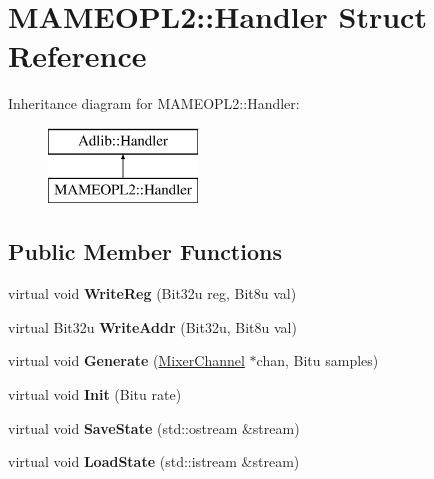 \hypertarget{structMAMEOPL2_1_1Handler}{\section{M\-A\-M\-E\-O\-P\-L2\-:\-:Handler Struct Reference}
\label{structMAMEOPL2_1_1Handler}
}
Inheritance diagram for M\-A\-M\-E\-O\-P\-L2\-:\-:Handler\-:\begin{figure}[H]
\begin{center}
\leavevmode
\includegraphics[height=2.000000cm]{structMAMEOPL2_1_1Handler}
\end{center}
\end{figure}
\subsection*{Public Member Functions}
\begin{DoxyCompactItemize}
\item 
\hypertarget{structMAMEOPL2_1_1Handler_a9432a798ae5818d012a865b4ec05efbb}{virtual void {\bfseries Write\-Reg} (Bit32u reg, Bit8u val)}\label{structMAMEOPL2_1_1Handler_a9432a798ae5818d012a865b4ec05efbb}

\item 
\hypertarget{structMAMEOPL2_1_1Handler_a697cf8d3aaa763a99ca01c51b193a152}{virtual Bit32u {\bfseries Write\-Addr} (Bit32u, Bit8u val)}\label{structMAMEOPL2_1_1Handler_a697cf8d3aaa763a99ca01c51b193a152}

\item 
\hypertarget{structMAMEOPL2_1_1Handler_a825d60c8d94af76fb466f980725ebe79}{virtual void {\bfseries Generate} (\hyperlink{classMixerChannel}{Mixer\-Channel} $\ast$chan, Bitu samples)}\label{structMAMEOPL2_1_1Handler_a825d60c8d94af76fb466f980725ebe79}

\item 
\hypertarget{structMAMEOPL2_1_1Handler_ae1ae4dd98b7022333e50505a8b36d78f}{virtual void {\bfseries Init} (Bitu rate)}\label{structMAMEOPL2_1_1Handler_ae1ae4dd98b7022333e50505a8b36d78f}

\item 
\hypertarget{structMAMEOPL2_1_1Handler_a4324807b758bae86fac4aaa0001a031f}{virtual void {\bfseries Save\-State} (std\-::ostream \&stream)}\label{structMAMEOPL2_1_1Handler_a4324807b758bae86fac4aaa0001a031f}

\item 
\hypertarget{structMAMEOPL2_1_1Handler_aabdcd0e6b3567f5c8769d2ceb6270f2f}{virtual void {\bfseries Load\-State} (std\-::istream \&stream)}\label{structMAMEOPL2_1_1Handler_aabdcd0e6b3567f5c8769d2ceb6270f2f}

\end{DoxyCompactItemize}

